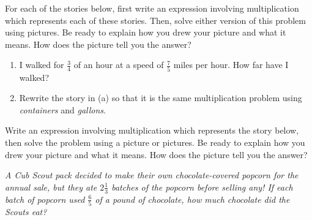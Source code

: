 \documentclass{ximera}
\begin{document}
\begin{problem}
 For each of the stories below, first write an expression involving multiplication which represents each of these stories.  Then, solve either version of this problem using pictures.  Be ready to explain how you drew your picture and what it means.  How does the picture tell you the answer? 

\begin{enumerate}
    \item I walked for  $\frac{3}{4}$ of an hour at a speed of  $\frac{7}{5}$ miles per hour.  How far have I walked?
    \item Rewrite the story in (a) so that it is the same multiplication problem using \emph{containers} and \emph{gallons}.
\end{enumerate}
\end{problem}
\vfill

\begin{problem}
 Write an expression involving multiplication which represents the story below, then solve the problem using a picture or pictures.  Be ready to explain how you drew your picture and what it means.  How does the picture tell you the answer?


\emph{A Cub Scout pack decided to make their own chocolate-covered popcorn for the annual sale, but they ate $2 \frac{1}{3}$ batches of the popcorn before selling any! If each batch of popcorn used $\frac{6}{5}$ of a pound of chocolate, how much chocolate did the Scouts eat?}

\end{problem}
\vfill
 
\end{document}
